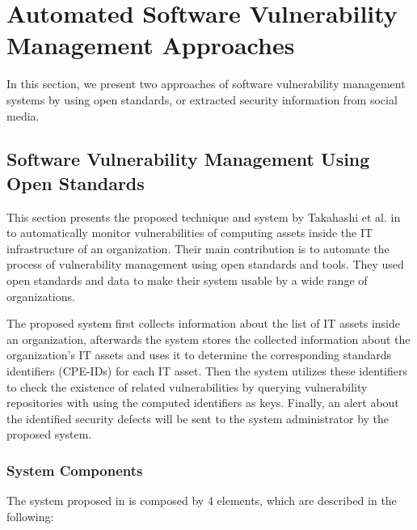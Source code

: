 \documentclass{llncs}
\begin{document}
\section{Automated	Software	Vulnerability	Management	Approaches}
 
 In this section, we present two approaches of software vulnerability management systems by using open standards, or extracted security information from social media.
\subsection{Software	Vulnerability	Management	Using	Open	Standards}

\par This section presents the proposed technique and system by Takahashi et al. in \cite{paper1} to automatically monitor vulnerabilities of computing assets inside the IT infrastructure of an organization. Their main contribution is to automate the process of vulnerability management using open standards and tools. They used open standards and data to make their system usable by a wide range of organizations.
\par
 The proposed system first collects information about the list of IT assets inside an organization, afterwards the system stores the collected information about the organization's IT assets and uses it to determine the corresponding standards identifiers (CPE-IDs) for each IT asset. Then the system utilizes these identifiers to check the existence of related vulnerabilities by querying vulnerability repositories with using the computed identifiers as keys. Finally, an alert about the identified security defects will be sent to the system administrator by the proposed system.
    
\subsubsection {System Components \newline}

\par
 The system proposed in \cite{paper1} is composed by 4 elements, which are described in the following:
\end{document}
